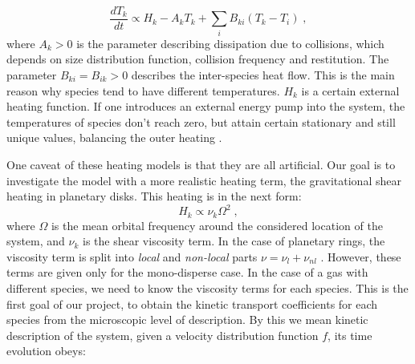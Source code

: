 \documentclass[11pt, notitlepage]{article} %
\begin{document}
\begin{equation}
	\frac{dT_k}{dt} \propto H_k -A_kT_k+\sum_{i}B_{ki}(T_k-T_i)\;,
\end{equation}
where $A_k>0$ is the parameter describing 
dissipation due to collisions, which depends on size distribution function, collision 
frequency and restitution. The parameter $B_{ki}=B_{ik}>0$ describes the inter-species 
heat flow. This is the main reason why species tend to have different temperatures. 
$H_k$ is a certain external heating function. If one introduces an external energy pump 
into the system, the temperatures of species don't reach zero, but attain certain 
stationary and still unique values, balancing the outer heating \cite{Bodrova2014}. 

One caveat of these heating models is that they are all artificial. Our goal 
is to investigate the model with a more realistic heating term, the gravitational 
shear heating in planetary disks. This heating is in the next form:
\begin{equation}
	H_k \propto \nu_k\Omega^2\;,
\end{equation}
where $\Omega$ is the mean orbital frequency around the considered location of the system,
and $\nu_k$ is the shear viscosity term. In the case of planetary rings, the viscosity
term is split into \emph{local} and \emph{non-local} parts $\nu=\nu_l+\nu_{nl}$ 
\cite{Seiss2011,spahn2006c,Stewart1984}.
However, these terms are given only for the mono-disperse case. In the case of a gas 
with different species, we need to know the viscosity terms for each species. 
This is the first goal of our project, to obtain the kinetic transport coefficients
for each species from the microscopic level of description. 
By this we mean kinetic description of the system, given a velocity distribution 
function $f$, its time evolution obeys:
\end{document}
